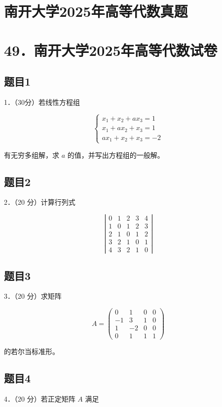 \documentclass{article}
\begin{document}
\section*{南开大学2025年高等代数真题}
\section*{49．南开大学2025年高等代数试卷}

\subsection{题目1}
1．（30分）若线性方程组

\[
\left\{\begin{array}{l}
x_{1}+x_{2}+a x_{3}=1 \\
x_{1}+a x_{2}+x_{3}=1 \\
a x_{1}+x_{2}+x_{3}=-2
\end{array}\right.
\]

有无穷多组解，求 \(a\) 的值，并写出方程组的一般解。

\subsection{题目2}
2．（20 分）计算行列式

\[
\left|\begin{array}{lllll}
0 & 1 & 2 & 3 & 4 \\
1 & 0 & 1 & 2 & 3 \\
2 & 1 & 0 & 1 & 2 \\
3 & 2 & 1 & 0 & 1 \\
4 & 3 & 2 & 1 & 0
\end{array}\right|
\]

\subsection{题目3}
3．（20 分）求矩阵

\[
A=\left(\begin{array}{cccc}
0 & 1 & 0 & 0 \\
-1 & 3 & 1 & 0 \\
1 & -2 & 0 & 0 \\
0 & 1 & 1 & 1
\end{array}\right)
\]

的若尔当标准形。

\subsection{题目4}
4．（20 分）若正定矩阵 \(A\) 满足
\end{document}
